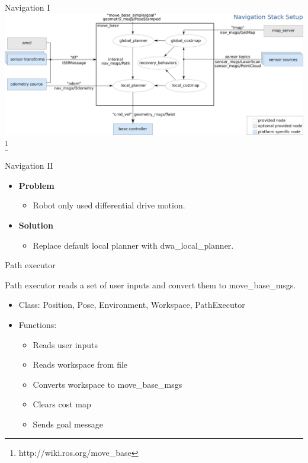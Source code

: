 \begin{frame}{Navigation I}
\centering
    \includegraphics[scale=0.27]{gfx/nav.png}
\footnote{http://wiki.ros.org/move\_base}
\end{frame}
\begin{frame}{Navigation II}
\begin{itemize}
	\item \textbf{Problem}
		\begin{itemize}
			\item Robot only used differential drive motion.
		\end{itemize}
	\item \textbf{Solution}
		\begin{itemize}
			\item Replace default local planner with dwa\_local\_planner.
		\end{itemize}
\end{itemize}
\end{frame}
\begin{frame}{Path executor}
    
    Path executor reads  a set of user inputs and convert them to move\_base\_msgs.
    \begin{itemize}
        \item Class: Position, Pose, Environment, Workspace, PathExecutor
        
        \item Functions:
        \begin{itemize}
        	\item Reads user inputs
        	\item Reads workspace from file
            \item Converts workspace to move\_base\_msgs
            \item Clears cost map
            \item Sends goal message
        \end{itemize}
    \end{itemize}
    
\end{frame}

